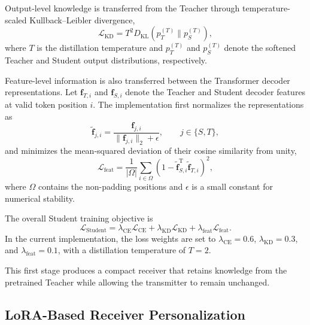 \documentclass[conference]{IEEEtran}
\begin{document}
Output-level knowledge is transferred from the Teacher through temperature-scaled Kullback--Leibler divergence,
\begin{equation}
    \mathcal{L}_{\mathrm{KD}}
    =
    T^2 D_{\mathrm{KL}}
    \left(
    p_T^{(T)}
    \parallel
    p_S^{(T)}
    \right),
\end{equation}
where $T$ is the distillation temperature and $p_T^{(T)}$ and $p_S^{(T)}$ denote the softened Teacher and Student output distributions, respectively.

Feature-level information is also transferred between the Transformer decoder representations. Let $\mathbf{f}_{T,i}$ and $\mathbf{f}_{S,i}$ denote the Teacher and Student decoder features at valid token position $i$. The implementation first normalizes the representations as
\begin{equation}
    \tilde{\mathbf{f}}_{j,i}
    =
    \frac{
        \mathbf{f}_{j,i}
    }{
        \lVert\mathbf{f}_{j,i}\rVert_2+\epsilon
    },
    \qquad j\in\{S,T\},
\end{equation}
and minimizes the mean-squared deviation of their cosine similarity from unity,
\begin{equation}
    \mathcal{L}_{\mathrm{feat}}
    =
    \frac{1}{|\Omega|}
    \sum_{i\in\Omega}
    \left(
        1-
        \tilde{\mathbf{f}}_{S,i}^{\mathrm{T}}
        \tilde{\mathbf{f}}_{T,i}
    \right)^2,
\end{equation}
where $\Omega$ contains the non-padding positions and $\epsilon$ is a small constant for numerical stability.

The overall Student training objective is
\begin{equation}
    \mathcal{L}_{\mathrm{Student}}
    =
    \lambda_{\mathrm{CE}}\mathcal{L}_{\mathrm{CE}}
    +
    \lambda_{\mathrm{KD}}\mathcal{L}_{\mathrm{KD}}
    +
    \lambda_{\mathrm{feat}}\mathcal{L}_{\mathrm{feat}}.
\end{equation}
In the current implementation, the loss weights are set to
$\lambda_{\mathrm{CE}}=0.6$,
$\lambda_{\mathrm{KD}}=0.3$, and
$\lambda_{\mathrm{feat}}=0.1$, with a distillation temperature of $T=2$.

This first stage produces a compact receiver that retains knowledge from the pretrained Teacher while allowing the transmitter to remain unchanged.

\subsection{LoRA-Based Receiver Personalization}
\end{document}
